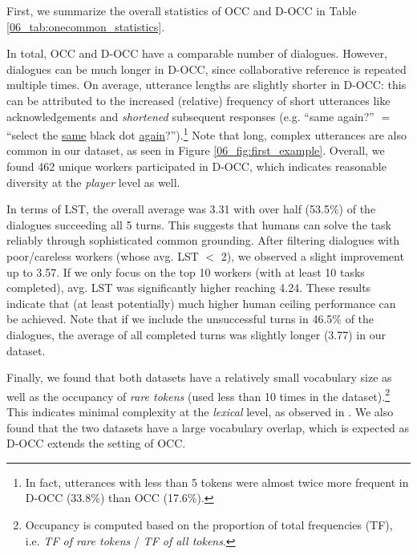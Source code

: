 First, we summarize the overall statistics of OCC and D-OCC in Table \ref{06_tab:onecommon_statistics}.

In total, OCC and D-OCC have a comparable number of dialogues. However, dialogues can be much longer in D-OCC, since collaborative reference is repeated multiple times. On average, utterance lengths are slightly shorter in D-OCC: this can be attributed to the increased (relative) frequency of short utterances like acknowledgements and \textit{shortened} subsequent responses (e.g. ``same again?'' $=$ ``select the \underline{same} black dot \underline{again}?'').\footnote{In fact, utterances with less than 5 tokens were almost twice more frequent in D-OCC (33.8\%) than OCC (17.6\%).} Note that long, complex utterances are also common in our dataset, as seen in Figure \ref{06_fig:first_example}. Overall, we found 462 unique workers participated in D-OCC, which indicates reasonable diversity at the \textit{player} level as well.

In terms of LST, the overall average was 3.31 with over half (53.5\%) of the dialogues succeeding all 5 turns. This suggests that humans can solve the task reliably through sophisticated common grounding. After filtering dialogues with poor/careless workers (whose avg. LST $<$ 2), we observed a slight improvement up to 3.57. If we only focus on the top 10 workers (with at least 10 tasks completed), avg. LST was significantly higher reaching 4.24. These results indicate that (at least potentially) much higher human ceiling performance can be achieved. Note that if we include the unsuccessful turns in 46.5\% of the dialogues, the average of all completed turns was slightly longer (3.77) in our dataset.

Finally, we found that both datasets have a relatively small vocabulary size as well as the occupancy of \textit{rare tokens} (used less than 10 times in the dataset).\footnote{Occupancy is computed based on the proportion of total frequencies (TF), i.e. \textit{TF of rare tokens} / \textit{TF of all tokens}.} This indicates minimal complexity at the \textit{lexical} level, as observed in \citet{udagawa2019natural}. We also found that the two datasets have a large vocabulary overlap, which is expected as D-OCC extends the setting of OCC.


